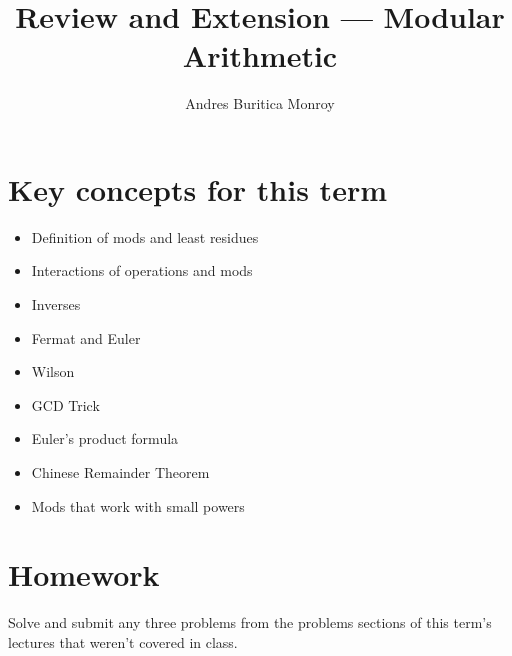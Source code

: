 \documentclass{article}
\title{Review and Extension --- Modular Arithmetic}
\author{Andres Buritica Monroy}
\date{}
\begin{document}
\maketitle
\section{Key concepts for this term}
\begin{itemize}
	\item Definition of mods and least residues
	\item Interactions of operations and mods
	\item Inverses
	\item Fermat and Euler
	\item Wilson
	\item GCD Trick
	\item Euler's product formula
	\item Chinese Remainder Theorem
	\item Mods that work with small powers
\end{itemize}
\section{Homework}
Solve and submit any three problems from the problems sections of this term's
lectures that weren't covered in class.
\end{document}
